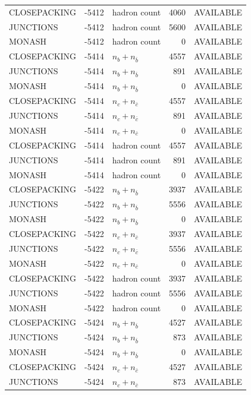 \begin{landscape}
\begin{longtable}{@{}lrlrl@{}}
CLOSEPACKING & -5412 & hadron count & \num{4060} & AVAILABLE \\
JUNCTIONS & -5412 & hadron count & \num{5600} & AVAILABLE \\
MONASH & -5412 & hadron count & \num{0} & AVAILABLE \\
CLOSEPACKING & -5414 & $n_b+n_{\bar b}$ & \num{4557} & AVAILABLE \\
JUNCTIONS & -5414 & $n_b+n_{\bar b}$ & \num{891} & AVAILABLE \\
MONASH & -5414 & $n_b+n_{\bar b}$ & \num{0} & AVAILABLE \\
CLOSEPACKING & -5414 & $n_c+n_{\bar c}$ & \num{4557} & AVAILABLE \\
JUNCTIONS & -5414 & $n_c+n_{\bar c}$ & \num{891} & AVAILABLE \\
MONASH & -5414 & $n_c+n_{\bar c}$ & \num{0} & AVAILABLE \\
CLOSEPACKING & -5414 & hadron count & \num{4557} & AVAILABLE \\
JUNCTIONS & -5414 & hadron count & \num{891} & AVAILABLE \\
MONASH & -5414 & hadron count & \num{0} & AVAILABLE \\
CLOSEPACKING & -5422 & $n_b+n_{\bar b}$ & \num{3937} & AVAILABLE \\
JUNCTIONS & -5422 & $n_b+n_{\bar b}$ & \num{5556} & AVAILABLE \\
MONASH & -5422 & $n_b+n_{\bar b}$ & \num{0} & AVAILABLE \\
CLOSEPACKING & -5422 & $n_c+n_{\bar c}$ & \num{3937} & AVAILABLE \\
JUNCTIONS & -5422 & $n_c+n_{\bar c}$ & \num{5556} & AVAILABLE \\
MONASH & -5422 & $n_c+n_{\bar c}$ & \num{0} & AVAILABLE \\
CLOSEPACKING & -5422 & hadron count & \num{3937} & AVAILABLE \\
JUNCTIONS & -5422 & hadron count & \num{5556} & AVAILABLE \\
MONASH & -5422 & hadron count & \num{0} & AVAILABLE \\
CLOSEPACKING & -5424 & $n_b+n_{\bar b}$ & \num{4527} & AVAILABLE \\
JUNCTIONS & -5424 & $n_b+n_{\bar b}$ & \num{873} & AVAILABLE \\
MONASH & -5424 & $n_b+n_{\bar b}$ & \num{0} & AVAILABLE \\
CLOSEPACKING & -5424 & $n_c+n_{\bar c}$ & \num{4527} & AVAILABLE \\
JUNCTIONS & -5424 & $n_c+n_{\bar c}$ & \num{873} & AVAILABLE \\

\end{longtable}
\end{landscape}

